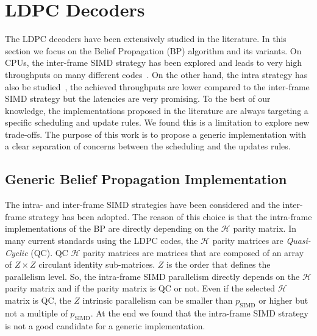 \section{LDPC Decoders}

The LDPC decoders have been extensively studied in the literature. In this
section we focus on the Belief Propagation (BP) algorithm and its variants. On
CPUs, the inter-frame SIMD strategy has been explored and leads to very high
throughputs on many different codes~\cite{LeGal2016}. On the other hand, the
intra strategy has also be studied~\cite{LeGal2019a,Xu2019}, the achieved
throughputs are lower compared to the inter-frame SIMD strategy but the
latencies are very promising. To the best of our knowledge, the implementations
proposed in the literature are always targeting a specific scheduling and update
rules. We found this is a limitation to explore new trade-offs. The purpose of
this work is to propose a generic implementation with a clear separation of
concerns between the scheduling and the updates rules.

\subsection{Generic Belief Propagation Implementation}

The intra- and inter-frame SIMD strategies have been considered and the
inter-frame strategy has been adopted. The reason of this choice is that
the intra-frame implementations of the BP are directly depending on the
$\mathcal{H}$ parity matrix. In many current standards using the LDPC codes, the
$\mathcal{H}$ parity matrices are \emph{Quasi-Cyclic} (QC). QC $\mathcal{H}$
parity matrices are matrices that are composed of an array of $Z \times Z$
circulant identity sub-matrices. $Z$ is the order that defines the parallelism
level. So, the intra-frame SIMD parallelism directly depends on the
$\mathcal{H}$ parity matrix and if the parity matrix is QC or not. Even if the
selected $\mathcal{H}$ matrix is QC, the $Z$ intrinsic parallelism can be
smaller than $p_\text{SIMD}$ or higher but not a multiple of $p_\text{SIMD}$. At
the end we found that the intra-frame SIMD strategy is not a good candidate for
a generic implementation.

